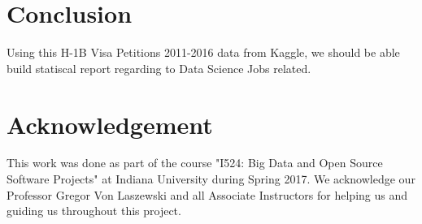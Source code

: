 \documentclass[9pt,twocolumn,twoside]{styles/osajnl}
\begin{document}
\section{Conclusion}

Using this H-1B Visa Petitions 2011-2016 data from Kaggle,  we should be able build statiscal report regarding to Data Science Jobs related. 

\section{Acknowledgement}

This work was done as part of the course "I524: Big Data and Open Source Software Projects" at Indiana University during Spring 2017. We acknowledge our Professor Gregor Von Laszewski and all Associate Instructors for helping us and guiding us throughout this project.




\end{document}
